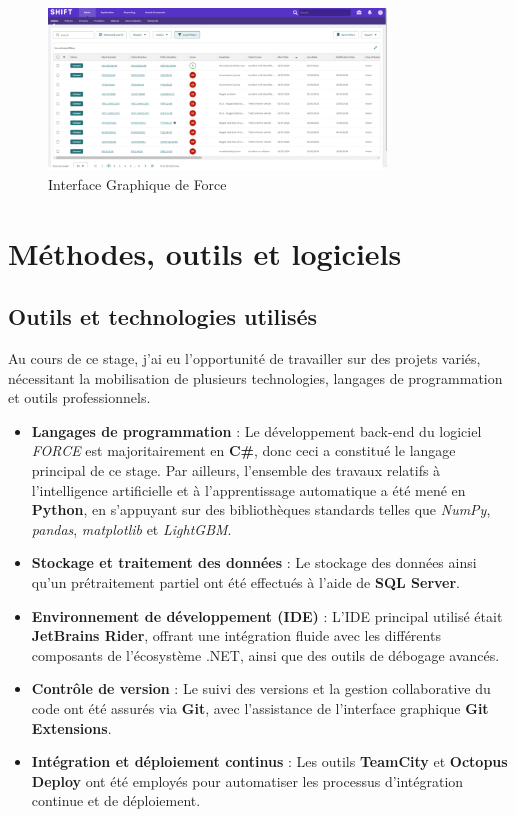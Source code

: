 \documentclass [twoside,openright,a4paper,11pt,french] {report}
\begin{document}
\begin{figure}[htbp]
    \centering
    \includegraphics[width=0.80\textwidth]{interfacegraphique.png}
    \caption{Interface  Graphique de Force}
    \label{fig:entonnoir}
\end{figure}





\section{Méthodes, outils et logiciels}
\subsection*{Outils et technologies utilisés}

Au cours de ce stage, j'ai eu l'opportunité de travailler sur des projets variés, nécessitant la mobilisation de plusieurs technologies, langages de programmation et outils professionnels.

\begin{itemize}
    \item \textbf{Langages de programmation} : Le développement back-end du logiciel \textit{FORCE} est majoritairement en \textbf{C\#}, donc ceci a constitué 
    le langage principal de ce stage. Par ailleurs, l'ensemble des travaux relatifs à l'intelligence artificielle et à l'apprentissage automatique a été mené en \textbf{Python}, en s'appuyant 
    sur des bibliothèques standards telles que \textit{NumPy}, \textit{pandas}, \textit{matplotlib} et \textit{LightGBM}.
    
    \item \textbf{Stockage et traitement des données} : Le stockage des données ainsi qu'un prétraitement partiel ont été effectués à l'aide de \textbf{SQL Server}.
    
    \item \textbf{Environnement de développement (IDE)} : L'IDE principal utilisé était \textbf{JetBrains Rider}, offrant une intégration fluide avec les différents composants de l'écosystème .NET, ainsi que des outils de débogage avancés.
    
    \item \textbf{Contrôle de version} : Le suivi des versions et la gestion collaborative du code ont été assurés via \textbf{Git}, avec l'assistance de l'interface graphique \textbf{Git Extensions}.
    
    \item \textbf{Intégration et déploiement continus} : Les outils \textbf{TeamCity} et \textbf{Octopus Deploy} ont été employés pour automatiser les processus d'intégration continue et de déploiement.
\end{itemize}
\end{document}

